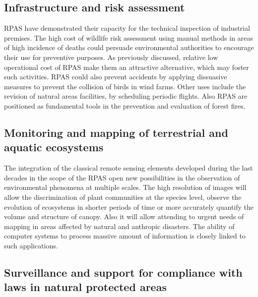 \documentclass[]{interact}
\theoremstyle{plain}%
\theoremstyle{definition}
\theoremstyle{remark}
\begin{document}
\subsection{Infrastructure and risk
assessment}\label{infrastructure-and-risk-assessment-1}

RPAS have demonstrated their capacity for the technical inspection of
industrial premises. The high cost of wildlife risk assessment using
manual methods in areas of high incidence of deaths could persuade
environmental authorities to encourage their use for preventive
purposes. As previously discussed, relative low operational cost of RPAS
make them an attractive alternative, which may foster such activities.
RPAS could also prevent accidents by applying dissuasive measures to
prevent the collision of birds in wind farms. Other uses include the
revision of natural areas facilities, by scheduling periodic flights.
Also RPAS are positioned as fundamental tools in the prevention and
evaluation of forest fires.

\subsection{Monitoring and mapping of terrestrial and aquatic
ecosystems}\label{monitoring-and-mapping-of-terrestrial-and-aquatic-ecosystems-1}

The integration of the classical remote sensing elements developed
during the last decades in the scope of the RPAS open new possibilities
in the observation of environmental phenomena at multiple scales. The
high resolution of images will allow the discrimination of plant
communities at the species level, observe the evolution of ecosystems in
shorter periods of time or more accurately quantify the volume and
structure of canopy. Also it will allow attending to urgent needs of
mapping in areas affected by natural and anthropic disasters. The
ability of computer systems to process massive amount of information is
closely linked to such applications.

\subsection{Surveillance and support for compliance with laws in natural
protected
areas}\label{surveillance-and-support-for-compliance-with-laws-in-natural-protected-areas}
\end{document}
